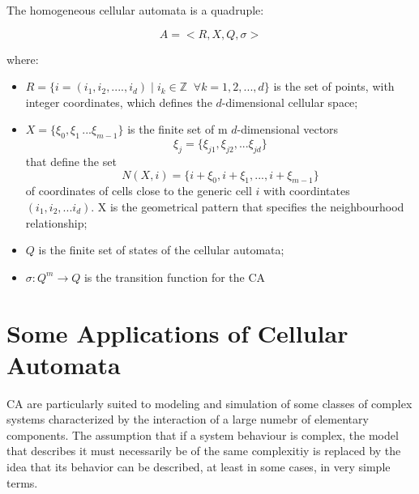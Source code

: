 The homogeneous cellular automata is a quadruple:

$$A = <R,X,Q,\sigma>$$

\noindent where:

\begin{itemize}
\item $R = \{i = (i_1,i_2,....,i_d) \; | \; i_k \in \mathbb{Z} \;\; \forall k =
  1,2,...,d\}$ is the set of points, with integer coordinates, which
  defines the $d$-dimensional cellular space;

\item $X = \{\xi_0,\xi_1\,...\xi_{m-1}\}$ is the finite set of m
  $d$-dimensional vectors
  \[ \xi_j = \{\xi_{j1},\xi_{j2},...\xi_{jd}\} \]
  that define the set
  \[ N(X,i) = \{i + \xi_0,i + \xi_1,...,i + \xi_{m-1}\} \]
  of coordinates of cells close to the generic cell $i$ with
  coordintates $(i_1,i_2,...i_d)$. X is the geometrical pattern that
  specifies the neighbourhood relationship;
  
\item $Q$ is the finite set of states of the cellular automata;
  
\item $\sigma : Q^m \rightarrow Q$ is the transition function for the CA

\end{itemize}


\section{Some Applications of Cellular Automata}

CA are particularly suited to modeling and simulation of some classes
of complex systems characterized by the interaction of a large numebr
of elementary components. The assumption that if a system behaviour is
complex, the model that describes it must necessarily be of the same
complexitiy is replaced by the idea that its behavior can be
described, at least in some cases, in very simple terms.

